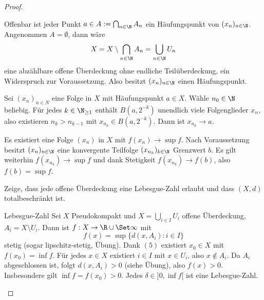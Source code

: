 \begin{st}
\begin{proof}
\begin{seg}[$(2) \implies (3)$]
			Offenbar ist jeder Punkt $a \in A := \bigcap_{n\in \N} A_n$ ein Häufungspunkt von $(x_n)_{n\in\N}$.
			Angenommen $A = \emptyset$, dann wäre
			\[
				X
				= X \setminus \bigcap_{n\in \N} A_n
				= \bigcup_{n \in \N} U_n
			\]
			eine abzählbare offene Überdeckung ohne endliche Teilüberdeckung, ein Widerspruch zur Voraussetzung.
			Also besitzt $(x_n)_{n\in\N}$ einen Häufungspunkt.
		\end{seg}
		\begin{seg}[$(3) \implies (4)$]
			Sei $(x_n)_{n\in N}$ eine Folge in $X$ mit Häufungspunkt $a \in X$.
			Wähle $n_0 \in \N$ beliebig.
			Für jedes $k \in \N_{\ge 1}$ enthält $B(a, 2^{-k})$ unendlich viele Folgenglieder $x_n$, also existieren $n_k > n_{k-1}$ mit $x_{n_k} \in B(a,2^{-k})$.
			Dann ist $x_{n_k} \to a$.
		\end{seg}
		\begin{seg}[$(4) \implies (5)$]
			Es existiert eine Folge $(x_n)$ in $X$ mit $f(x_n) \to \sup f$.
			Nach Voraussetzung besitzt $(x_n)_{n\in\N}$ eine konvergente Teilfolge $(x_{n_k})_{k\in\N}$ Grenzwert $b$.
			Es gilt weiterhin $f(x_{n_k}) \to \sup f$ und dank Stetigkeit $f(x_{n_k}) \to f(b)$, also $f(b) = \sup f$.
		\end{seg}
		\begin{seg}[$(5) \implies (6)$]
			Zeige, dass jede offene Überdeckung eine Lebesgue-Zahl erlaubt und dass $(X, d)$ totalbeschränkt ist.
			\begin{seg}{Lebesgue-Zahl}
				Sei $X$ Pseudokompakt und $X = \bigcup_{i \in I} U_i$ offene Überdeckung, $A_i = X \setminus U_i$.
				Dann ist $f: X \to \R \cup \Set \infty$ mit
				\[
					f(x) = \sup \{ d(x, A_i) : i \in I \}
				\]
				stetig (sogar lipschitz-stetig, Übung).
				Dank $(5)$ existiert $x_0 \in X$ mit $f(x_0) = \inf f$.
				Für jedes $x \in X$ existiert $i \in I$ mit $x \in U_i$, also $x \not\in A_i$.
				Da $A_i$ abgeschlossen ist, folgt $d(x,A_i) > 0$ (siehe Übung), also $f(x) > 0$.
				Insbesondere gilt $\inf f = f(x_0) > 0$.
				Jedes $\delta \in ]0, \inf f[$ ist eine Lebesgue-Zahl.
			\end{seg}


\end{seg}
\end{proof}
\end{st}
